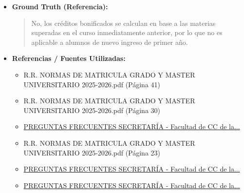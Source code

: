 \documentclass[12pt,a4paper,oneside]{report}
\begin{document}
\begin{itemize}
\begin{itemize}
\begin{quote}
\noindent\textbf{Límites de la bonificación:}\\

\begin{itemize}
  \item Solo serán objeto de bonificación los créditos que sean necesarios para la obtención del título conforme al plan de estudios y, en su caso, las especialidades y menciones vinculadas al título donde proceda la bonificación.
  \item Quienes hayan sido beneficiarios de una bonificación total o parcial en dos títulos de máster universitario, no podrán recibir bonificación en un tercero o sucesivos.
\end{itemize}
                \end{quote}
          \item \textbf{{Ground Truth (Referencia):}} \\
                \begin{quote}
No, los créditos bonificados se calculan en base a las materias superadas en el curso inmediatamente anterior, por lo que no es aplicable a alumnos de nuevo ingreso de primer año.
                \end{quote}
          \item \textbf{{Referencias / Fuentes Utilizadas:}} \\
                \begin{itemize}
                  \item R.R. NORMAS DE MATRICULA GRADO Y MASTER UNIVERSITARIO 2025-2026.pdf (Página 41)
                  \item R.R. NORMAS DE MATRICULA GRADO Y MASTER UNIVERSITARIO 2025-2026.pdf (Página 30)
                  \item \href{https://educacion.us.es/examenes/103-el-centro/1-2-secretaria-administracion/1-2-0-secretaria-del-centro/691-preguntas-frecuentes-secretaria}{PREGUNTAS FRECUENTES SECRETARÍA - Facultad de CC de la...}
                  \item R.R. NORMAS DE MATRICULA GRADO Y MASTER UNIVERSITARIO 2025-2026.pdf (Página 23)
                  \item \href{https://fcce.us.es/en/el-centro/secretaria-administracion/secretaria/103-el-centro/1-2-secretaria-administracion/1-2-0-secretaria-del-centro/691-preguntas-frecuentes-secretaria}{PREGUNTAS FRECUENTES SECRETARÍA - Facultad de CC de la...}
                  \item \href{https://fcce.us.es/el-centro/organizacion/actas-de-junta-de-facultad/103-el-centro/1-2-secretaria-administracion/1-2-0-secretaria-del-centro/691-preguntas-frecuentes-secretaria}{PREGUNTAS FRECUENTES SECRETARÍA - Facultad de CC de la...}

\end{itemize}
\end{itemize}
\end{itemize}
\end{document}
